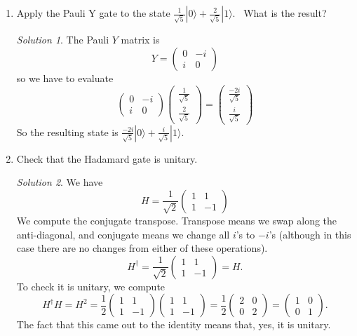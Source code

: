 \documentclass{article}
\theoremstyle{plain}
\theoremstyle{definition}
\theoremstyle{remark}
\newtheorem*{solution}{Solution}
\numberwithin{theorem}{section}
\begin{document}
\begin{enumerate}


\item Apply the Pauli Y gate to the state $\frac{1}{\sqrt{5}} |0\rangle + \frac{2}{\sqrt{5}} |1 \rangle$.  What is the result?

\begin{solution}
The Pauli $Y$ matrix is
\[
Y = \begin{pmatrix}
    0 & -i \\ i & 0 
\end{pmatrix}
\]
so we have to evaluate
\[
\begin{pmatrix}
    0 & -i \\ i & 0 
\end{pmatrix}
\begin{pmatrix}
    \frac{1}{\sqrt{5}} \\ 
    \frac{2}{\sqrt{5}}
\end{pmatrix}
= 
\begin{pmatrix}
    \frac{-2i}{\sqrt{5}} \\ 
    \frac{i}{\sqrt{5}}
\end{pmatrix}
\]
So the resulting state is $\frac{-2i}{\sqrt{5}} |0\rangle + \frac{i}{\sqrt{5}} |1 \rangle$.
\end{solution}


\item Check that the Hadamard gate is unitary.

\begin{solution}
We have
\[
H = \frac{1}{\sqrt{2}}\begin{pmatrix}
    1 & 1 \\ 1 & -1 
\end{pmatrix}
\]
We compute the conjugate transpose.  Transpose means we swap along the anti-diagonal, and conjugate means we change all $i$'s to $-i$'s (although in this case there are no changes from either of these operations).
\[
H^\dagger = \frac{1}{\sqrt{2}}\begin{pmatrix}
    1 & 1 \\ 1 & -1 
\end{pmatrix} = H.
\]
To check it is unitary, we compute
\[
H^\dagger H = H^2 = \frac{1}{{2}}
\begin{pmatrix}
    1 & 1 \\ 1 & -1 
\end{pmatrix}
\begin{pmatrix}
    1 & 1 \\ 1 & -1 
\end{pmatrix}
=
\frac{1}{2} \begin{pmatrix}
    2 & 0 \\ 0 & 2 
\end{pmatrix}
=
 \begin{pmatrix}
    1 & 0 \\ 0 & 1 
\end{pmatrix}.
\]
The fact that this came out to the identity means that, yes, it is unitary.
\end{solution}


\end{enumerate}
\end{document}
